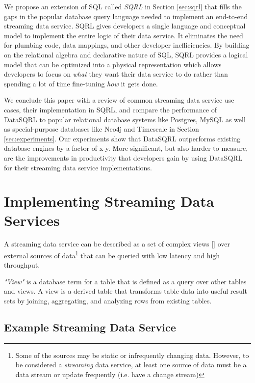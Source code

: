 \documentclass[	DIV=calc,%
							paper=letter,%
							fontsize=11pt,%
							twocolumn]{scrartcl}	 					%
\begin{document}
We propose an extension of SQL called \emph{SQRL} in Section \ref{sec:sqrl} that fills the gaps in the popular database query language needed to implement an end-to-end streaming data service. SQRL gives developers a single language and conceptual model to implement the entire logic of their data service. It eliminates the need for plumbing code, data mappings, and other developer inefficiencies. By building on the relational algebra and declarative nature of SQL, SQRL provides a logical model that can be optimized into a physical representation which allows developers to focus on \textit{what} they want their data service to do rather than spending a lot of time fine-tuning \textit{how} it gets done.

We conclude this paper with a review of common streaming data service use cases, their implementation in SQRL, and compare the performance of DataSQRL to popular relational database systems like Postgres, MySQL as well as special-purpose databases like Neo4j and Timescale in Section \ref{sec:experiments}. Our experiments show that DataSQRL outperforms existing database engines by a factor of x-y. More significant, but also harder to measure, are the improvements in productivity that developers gain by using DataSQRL for their streaming data service implementations.

\section{Implementing Streaming Data Services}
\label{sec:viewstore}

A streaming data service can be described as a set of complex views \ref{} over external sources of data\footnote{Some of the sources may be static or infrequently changing data. However, to be considered a \emph{streaming} data service, at least one source of data must be a data stream or update frequently (i.e. have a change stream)} that can be queried with low latency and high throughput.

\emph{"View"} is a database term for a table that is defined as a query over other tables and views. A view is a derived table that transforms table data into useful result sets by joining, aggregating, and analyzing rows from existing tables.

\subsection{Example Streaming Data Service}
\label{sec:example_iot}
\end{document}

